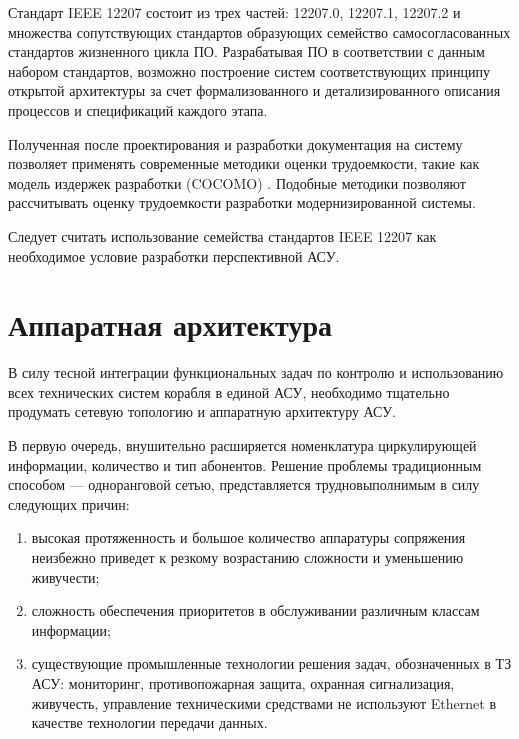 \documentclass[paper=a4, fontsize=12pt, titlepage=false, twoside=false]{scrartcl}
\begin{document}
Стандарт IEEE 12207 состоит из трех частей: 12207.0, 12207.1, 12207.2
и множества сопутствующих стандартов \cite{impl12207} образующих
семейство самосогласованных стандартов жизненного цикла ПО. 
Разрабатывая ПО в соответствии с данным набором стандартов,
возможно построение систем соответствующих принципу открытой
архитектуры за счет формализованного и детализированного описания
процессов и спецификаций каждого этапа.

Полученная после проектирования и разработки
документация на систему позволяет
применять современные методики оценки трудоемкости, такие как
модель издержек разработки (COCOMO) \cite{cocomo2}.
Подобные методики позволяют рассчитывать оценку
трудоемкости разработки модернизированной системы.

Следует считать использование семейства стандартов
IEEE 12207 как необходимое условие разработки перспективной АСУ.



\section{Аппаратная архитектура}

В силу тесной интеграции функциональных
задач по контролю и использованию всех технических
систем корабля в единой АСУ, необходимо тщательно продумать
сетевую топологию и аппаратную архитектуру АСУ.

В первую очередь, внушительно
расширяется номенклатура циркулирующей информации, количество и тип
абонентов. Решение проблемы традиционным способом — одноранговой
сетью, представляется трудновыполнимым в силу следующих причин:
\begin{enumerate}
  \item высокая протяженность и большое количество аппаратуры сопряжения
        неизбежно приведет к резкому возрастанию сложности и уменьшению
        живучести;
  \item сложность обеспечения приоритетов в обслуживании различным
        классам информации;
  \item существующие промышленные технологии решения задач,
        обозначенных в ТЗ АСУ: мониторинг, противопожарная защита,
        охранная сигнализация, живучесть, управление техническими
        средствами не используют Ethernet в качестве технологии передачи
        данных.
\end{enumerate}
\end{document}

